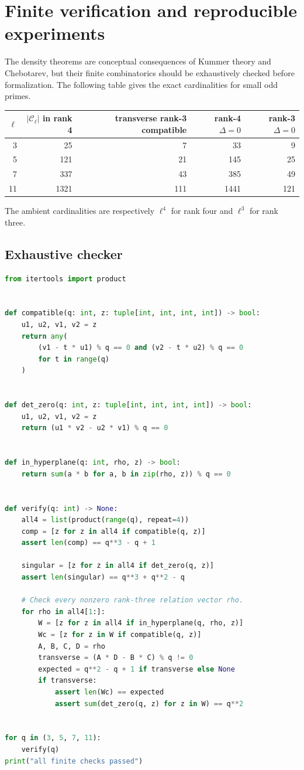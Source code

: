 \documentclass[11pt,oneside]{article}
\theoremstyle{definition}
\theoremstyle{remark}
\begin{document}
\section{Finite verification and reproducible experiments}\label{sec:computation}

The density theorems are conceptual consequences of Kummer theory and
Chebotarev, but their finite combinatorics should be exhaustively checked
before formalization.  The following table gives the exact cardinalities for
small odd primes.

\begin{center}
\begin{tabular}{@{}rrrrr@{}}
\toprule
$\ell$ & $|\mathcal C_\ell|$ in rank 4 & transverse rank-3 compatible & rank-4 $\Delta=0$ & rank-3 $\Delta=0$\\
\midrule
3  & 25   & 7   & 33   & 9\\
5  & 121  & 21  & 145  & 25\\
7  & 337  & 43  & 385  & 49\\
11 & 1321 & 111 & 1441 & 121\\
\bottomrule
\end{tabular}
\end{center}
The ambient cardinalities are respectively $\ell^4$ for rank four and
$\ell^3$ for rank three.

\subsection{Exhaustive checker}

\begin{lstlisting}[language=Python,caption={Exhaustive verification of the compatibility formulas}]
from itertools import product


def compatible(q: int, z: tuple[int, int, int, int]) -> bool:
    u1, u2, v1, v2 = z
    return any(
        (v1 - t * u1) % q == 0 and (v2 - t * u2) % q == 0
        for t in range(q)
    )


def det_zero(q: int, z: tuple[int, int, int, int]) -> bool:
    u1, u2, v1, v2 = z
    return (u1 * v2 - u2 * v1) % q == 0


def in_hyperplane(q: int, rho, z) -> bool:
    return sum(a * b for a, b in zip(rho, z)) % q == 0


def verify(q: int) -> None:
    all4 = list(product(range(q), repeat=4))
    comp = [z for z in all4 if compatible(q, z)]
    assert len(comp) == q**3 - q + 1

    singular = [z for z in all4 if det_zero(q, z)]
    assert len(singular) == q**3 + q**2 - q

    # Check every nonzero rank-three relation vector rho.
    for rho in all4[1:]:
        W = [z for z in all4 if in_hyperplane(q, rho, z)]
        Wc = [z for z in W if compatible(q, z)]
        A, B, C, D = rho
        transverse = (A * D - B * C) % q != 0
        expected = q**2 - q + 1 if transverse else None
        if transverse:
            assert len(Wc) == expected
            assert sum(det_zero(q, z) for z in W) == q**2


for q in (3, 5, 7, 11):
    verify(q)
print("all finite checks passed")
\end{lstlisting}
\end{document}
